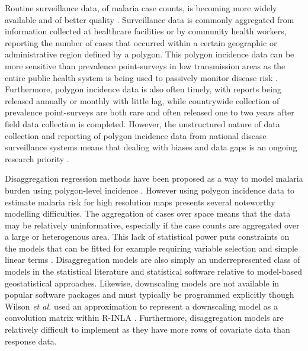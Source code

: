 \documentclass[10pt,letterpaper]{article}
\begin{document}

Routine surveillance data, of malaria case counts, is becoming more widely available and of better quality \cite{sturrock2016mapping, ohrt2015information, cibulskis2011worldwide}.
Surveillance data is commonly aggregated from information collected at healthcare facilities or by community health workers, reporting the number of cases that occurred within a certain geographic or administrative region defined by a polygon.
This polygon incidence data can be more sensitive than prevalence point-surveys in low transmission areas as the entire public health system is being used to passively monitor disease risk \cite{cibulskis2011worldwide}.
Furthermore, polygon incidence data is also often timely, with reports being released annually or monthly with little lag, while countrywide collection of prevalence point-surveys are both rare and often released one to two years after field data collection is completed.
However, the unstructured nature of data collection and reporting of polygon incidence data from national disease surveillance systems means that dealing with biases and data gaps is an ongoing research priority \cite{battle2016treatment, cibulskis2011worldwide}.


Disaggregation regression methods have been proposed as a way to model malaria burden using polygon-level incidence \cite{sturrock2014fine, wilson2017pointless, law2018variational, taylor2017continuous, li2012log}.
However using polygon incidence data to estimate malaria risk for high resolution maps presents several noteworthy modelling difficulties. 
The aggregation of cases over space means that the data may be relatively uninformative, especially if the case counts are aggregated over a large or heterogenous area.
This lack of statistical power puts constraints on the models that can be fitted for example requiring variable selection and simple linear terms \cite{sturrock2014fine}.
Disaggregation models are also simply an underrepresented class of models in the statistical literature and statistical software relative to model-based geostatistical approaches.
Likewise, downscaling models are not available in popular software packages and must typically be programmed explicitly though Wilson \emph{et al.} \cite{wilson2017pointless} used an approximation to represent a downscaling model as a convolution matrix within R-INLA \cite{INLA}.
Furthermore, disaggregation models are relatively difficult to implement as they have more rows of covariate data than response data.
\end{document}
